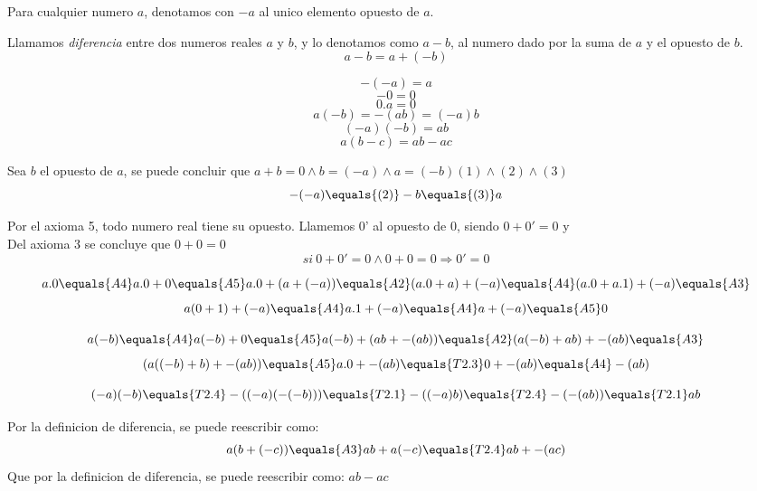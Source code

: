 \documentclass[10pt]{article}
\begin{document}
Para cualquier numero $a$, denotamos con $-a$ al unico elemento opuesto de $a$.

\begin{data}{}
Llamamos \textit{diferencia} entre dos numeros reales $a$ y $b$, y lo denotamos como $a-b$, al numero dado por la suma de $a$ y el opuesto de $b$.
$$a-b = a+ (-b)$$
\end{data}

\begin{theo}[]{}
\begin{multicols}{2}
$$-(-a)=a$$
$$-0 = 0$$
$$0.a = 0$$
$$a(-b) = -(ab) = (-a)b$$
$$(-a)(-b)=ab$$
$$a(b-c)=ab-ac$$
\end{multicols}
\end{theo}

\begin{prf}{}
Sea $b$ el opuesto de $a$, se puede concluir que $a+b=0 \land b=(-a) \land a=(-b)$\hfill$(1)\land(2)\land(3)$
$$-(-a)\equals{(2)}-b\equals{(3)}a$$
\end{prf}

\begin{prf}{}
Por el axioma 5, todo numero real tiene su opuesto. Llamemos 0' al opuesto de 0, siendo $0+0'=0$ y\\
Del axioma 3 se concluye que $0+0=0$
$$si\ 0+0'=0 \land 0+0=0 \Rightarrow 0'=0$$
\end{prf}

\begin{prf}{}
$$a.0 \equals{A4} a.0+0 \equals{A5} a.0+(a+(-a)) \equals{A2} (a.0+a)+(-a) \equals{A4} (a.0+a.1)+(-a) \equals{A3}$$
$$a(0+1)+(-a) \equals{A4} a.1+(-a) \equals{A4} a+(-a) \equals{A5} 0$$
\end{prf}

\begin{prf}[$a(-b)=-(ab)=(-a)b$]{}
$$
a(-b) \equals{A4}
a(-b)+0 \equals{A5}
a(-b)+(ab+-(ab)) \equals{A2}
(a(-b)+ab)+-(ab) \equals{A3}$$$$
(a((-b)+b)+-(ab)) \equals{A5}
a.0+-(ab) \equals{T2.3}
0+-(ab) \equals{A4}
-(ab)
$$
\end{prf}

\begin{prf}[$(-a)(-b)=ab$]{}
$$
(-a)(-b) \equals{T2.4}
-((-a)(-(-b))) \equals{T2.1}
-((-a)b) \equals{T2.4}
-(-(ab)) \equals{T2.1}
ab
$$
\end{prf}

\begin{prf}[$a(b-c)=ab-ac$]{}
Por la definicion de diferencia, se puede reescribir como:
$$
a(b+(-c)) \equals{A3}
ab+a(-c) \equals{T2.4}
ab+-(ac)
$$
Que por la definicion de diferencia, se puede reescribir como: $ab-ac$
\end{prf}
\end{document}
